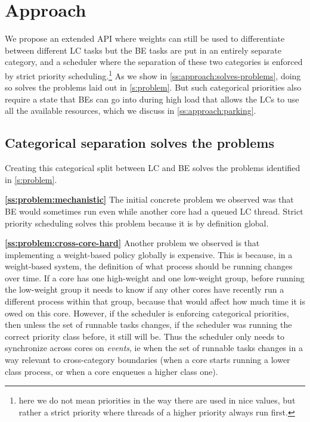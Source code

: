 \section{Approach}\label{s:approach}

We propose an extended \cgroups{} API where weights can still be used to
differentiate between different LC tasks but the BE tasks are put in an entirely
separate category, and a scheduler where the separation of these two categories
is enforced by strict priority scheduling.\footnote{here we do not mean
priorities in the way there are used in nice values, but rather a strict
priority where threads of a higher priority always run first.} As we show in
\autoref{ss:approach:solves-problems}, doing so solves the problems laid out in
\autoref{s:problem}. But such categorical priorities also require a state that
BEs can go into during high load that allows the LCs to use all the available
resources, which we discuss in \autoref{ss:approach:parking}.

\subsection{Categorical separation solves the
problems}\label{ss:approach:solves-problems}

Creating this categorical split between LC and BE  solves the problems
identified in \autoref{s:problem}.

\textbf{\autoref{ss:problem:mechanistic}} The initial concrete problem we
observed was that BE would sometimes run even while another core had a queued LC
thread. Strict priority scheduling solves this problem because it is by
definition global.

\textbf{\autoref{ss:problem:cross-core-hard}} Another problem we observed is
that implementing a weight-based policy globally is expensive. This is because,
in a weight-based system, the definition of what process should be running
changes over time. If a core has one high-weight and one low-weight group,
before running the low-weight group it needs to know if any other cores have
recently run a different process within that group, because that would affect
how much time it is owed on this core. However, if the scheduler is enforcing
categorical priorities, then unless the set of runnable tasks changes, if the
scheduler was running the correct priority class before, it still will be. Thus
the scheduler only needs to synchronize across cores on \textit{events}, ie when
the set of runnable tasks changes in a way relevant to cross-category boundaries
(when a core starts running a lower class process, or when a core enqueues a
higher class one).

